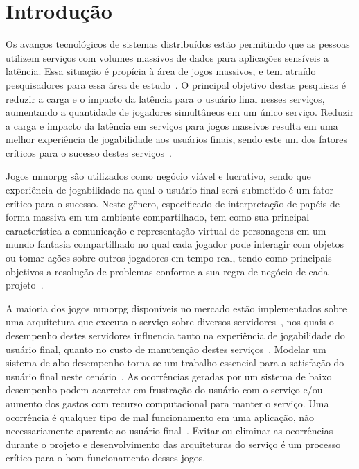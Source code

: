 \chapter{Introdução}
\label{introducao}



Os avanços tecnológicos de sistemas distribuídos estão permitindo que as pessoas utilizem serviços com volumes massivos de dados para aplicações sensíveis a latência.
%
Essa situação é propícia à área de jogos massivos, e tem atraído pesquisadores para essa área de estudo~\cite{mmo_analytic,1417630,6267019,6063041}.
%
O principal objetivo destas pesquisas é reduzir a carga e o impacto da latência para o usuário final nesses serviços, aumentando a quantidade de jogadores simultâneos em um único serviço.
%
Reduzir a carga e impacto da latência em serviços para jogos massivos resulta em uma melhor experiência de jogabilidade aos usuários finais, sendo este um dos fatores críticos para o sucesso destes serviços~\cite{1417630}.



Jogos \ac{mmorpg} são utilizados como negócio viável e lucrativo, sendo que experiência de jogabilidade na qual o usuário final será submetido é um fator crítico para o sucesso.
%
Neste gênero, especificado de interpretação de papéis de forma massiva em um ambiente compartilhado, tem como sua principal característica a comunicação e representação virtual de personagens em um mundo fantasia compartilhado no qual cada jogador pode interagir com objetos ou tomar ações sobre outros jogadores em tempo real, tendo como principais objetivos a resolução de problemas conforme a sua regra de negócio de cada projeto~\cite{video_game_technologies}.



A maioria dos jogos \ac{mmorpg} disponíveis no mercado estão implementados sobre uma arquitetura que executa o serviço sobre diversos servidores~\cite{stephenclarkewillson2017}, nos quais o desempenho destes servidores influencia tanto na experiência de jogabilidade do usuário final, quanto no custo de manutenção destes serviços~\cite{1417630}.
%
Modelar um sistema de alto desempenho torna-se um trabalho essencial para a satisfação do usuário final neste cenário~\cite{1417630}.
%
As ocorrências geradas por um sistema de baixo desempenho podem acarretar em frustração do usuário com o serviço e/ou aumento dos gastos com recurso computacional para manter o serviço.
%
Uma ocorrência é qualquer tipo de mal funcionamento em uma aplicação, não necessariamente aparente ao usuário final~\cite{1417630}.
%
Evitar ou eliminar as ocorrências durante o projeto e desenvolvimento das arquiteturas do serviço é um processo crítico para o bom funcionamento desses jogos.



